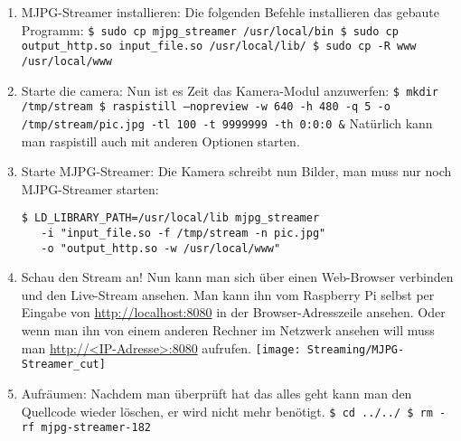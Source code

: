 \documentclass[12pt,a4paper,titlepage]{scrartcl} %
\begin{document}
\begin{enumerate}
\item MJPG-Streamer installieren:\newline
\textnormal{Die folgenden Befehle installieren das gebaute Programm:}\newline
\texttt{\$ sudo cp mjpg\_streamer /usr/local/bin\newline
\$ sudo cp output\_http.so input\_file.so /usr/local/lib/\newline
\$ sudo cp -R www /usr/local/www}

\item Starte die camera:\newline
\textnormal{Nun ist es Zeit das Kamera-Modul anzuwerfen:}\newline
\texttt{\$ mkdir /tmp/stream\newline
\$ raspistill --nopreview -w 640 -h 480 -q 5 -o /tmp/stream/pic.jpg -tl 100 -t 9999999 -th 0:0:0 \&}\newline
\textnormal{Natürlich kann man raspistill auch mit anderen Optionen starten.}

\item Starte MJPG-Streamer:\newline
\textnormal{Die Kamera schreibt nun Bilder, man muss nur noch MJPG-Streamer starten:}\newline
\ttfamily
\begin{lstlisting}[breaklines]
$ LD_LIBRARY_PATH=/usr/local/lib mjpg_streamer 
   -i "input_file.so -f /tmp/stream -n pic.jpg" 
   -o "output_http.so -w /usr/local/www"
\end{lstlisting}
\normalfont

\item Schau den Stream an!\newline
\textnormal{Nun kann man sich über einen Web-Browser verbinden und den Live-Stream ansehen. Man kann ihn vom Raspberry Pi selbst per Eingabe von \url{http://localhost:8080} in der Browser-Adresszeile ansehen. Oder wenn man ihn von einem anderen Rechner im Netzwerk ansehen will muss man \url{http://<IP-Adresse>:8080} aufrufen.}\newline
	    \texttt{[image: Streaming/MJPG-Streamer\_cut]}

\item Aufräumen:\newline
\textnormal{Nachdem man überprüft hat das alles geht kann man den Quellcode wieder löschen, er wird nicht mehr benötigt.}\newline
\texttt{\$ cd ../../\newline
\$ rm -rf mjpg-streamer-182}
\end{enumerate}
\end{document}
